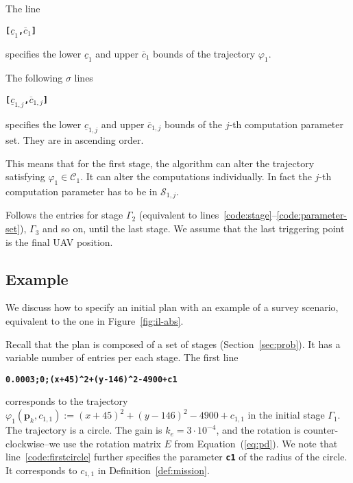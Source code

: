 \documentclass[letterpaper,10pt,conference]{ieeeconf}
\theoremstyle{definition}
\begin{document}
The line
\begin{algorithmic}[1]
  \STATE\textbf{\texttt{[$\underline{c}_1$,$\overline{c}_1$]}}\label{code:tee-set}
\end{algorithmic}
specifies the lower $\underline{c}_{1}$ and upper $\overline{c}_{1}$ bounds of the trajectory $\varphi_1$.

The following $\sigma$ lines
\begin{algorithmic}[1]
  \STATE\textbf{\texttt{[$\underline{c}_{1,j}$,$\overline{c}_{1,j}$]}}\label{code:parameter-set}
\end{algorithmic}
specifies the lower $\underline{c}_{1,j}$ and upper $\overline{c}_{1,j}$ bounds of the $j$-th computation parameter set. They are in ascending order. 

This means that for the first stage, the algorithm can alter the trajectory satisfying $\varphi_1\in\mathcal{C}_1$. It can alter the computations individually. In fact the $j$-th computation parameter has to be in $\mathcal{S}_{1,j}$.

Follows the entries for stage $\Gamma_2$ (equivalent to lines~\ref{code:stage}--\ref{code:parameter-set}), $\Gamma_3$ and so on, until the last stage. We assume that the last triggering point is the final UAV position.

\subsection{Example}
\label{app:plan-example}

We discuss how to specify an initial plan with an example of a survey scenario, equivalent to the one in Figure~\ref{fig:il-abs}.  

Recall that the plan is composed of a set of stages (Section~\ref{sec:prob}). It has a variable number of entries per each stage. The first line
\begin{algorithmic}[1]
  \STATE\textbf{\texttt{0.0003;0;(x+45)\^{}2+(y-146)\^{}2-4900+c1}}\label{code:firstcircle}
\end{algorithmic}
corresponds to the trajectory $\varphi_1(\mathbf{p}_k,c_{1,1}):=(x+45)^2+(y-146)^2-4900+c_{1,1}$ in the initial stage $\Gamma_1$. The trajectory is a circle. The gain is $k_e=3\cdot 10^{-4}$, and the rotation is counter-clockwise--we use the rotation matrix $E$ from Equation~(\ref{eq:pd}). We note that line~\ref{code:firstcircle} further specifies the parameter {\tt\textbf{c1}} of the radius of the circle. It corresponds to $c_{1,1}$ in Definition~\ref{def:mission}.
\end{document}
